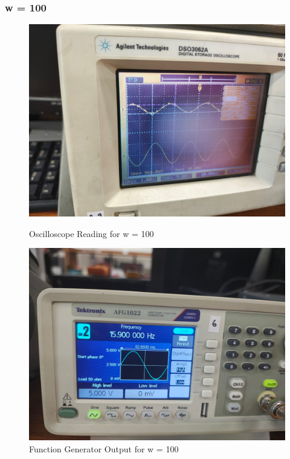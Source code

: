 \documentclass[a4paper,12pt]{article}
\begin{document}
\subsubsection{w = 100}
\begin{figure}[H]
    \centering
    \begin{minipage}{0.48\textwidth}
        \centering
        \includegraphics[width=\textwidth]{fig/3w100o.jpeg} %
        \caption{Oscilloscope Reading for w = 100}
    \end{minipage}
    \hfill
    \begin{minipage}{0.48\textwidth}
        \centering
        \includegraphics[width=\textwidth]{fig/1w100.jpeg} %
        \caption{Function Generator Output for w = 100}
    \end{minipage}
\end{figure}
\end{document}
